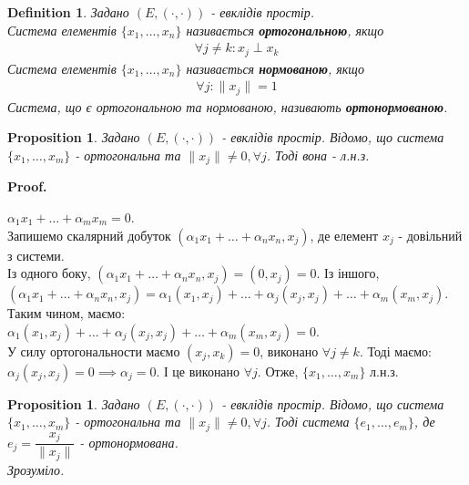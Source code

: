 \documentclass[a4paper, 10pt]{article}
\makeatletter
\theoremstyle{theoremdd}
\newtheorem{definition}[theorem]{Definition}
\newtheorem{proposition}[theorem]{Proposition}
\newtheorem{remark}[theorem]{Remark}
\renewenvironment{proof}[1][Proof.\\]{\par
\pushQED{\hfill \qed}%
\normalfont \topsep6\p@\@plus6\p@\relax
\trivlist
\item\relax
{\bfseries
#1\@addpunct{.}}\hspace\labelsep\ignorespaces
}{%
\popQED\endtrivlist\@endpefalse
}
\makeatother
\begin{document}
\begin{definition}
Задано $(E,(\cdot, \cdot))$ - евклідів простір.\\
Система елементів $\{x_1,\dots,x_n\}$ називається \textbf{ортогональною}, якщо
\begin{align*}
\forall j \neq k: x_j \perp x_k
\end{align*}
Система елементів $\{x_1,\dots,x_n\}$ називається \textbf{нормованою}, якщо
\begin{align*}
\forall j: \|x_j\| = 1
\end{align*}
Система, що є ортогональною та нормованою, називають \textbf{ортонормованою}.
\end{definition}

\iffalse
\begin{remark}
Надалі будемо скорочувати позначення $(x_j,x_k) = \delta_{jk} = \begin{cases} 0 & j \neq k \\ 1 & j = k \end{cases}$ - символ Кронекера.
\end{remark}
\fi

\begin{proposition}
Задано $(E,(\cdot,\cdot))$ - евклідів простір. Відомо, що система $\{x_1,\dots,x_m\}$ - ортогональна та $\|x_j\| \neq 0, \forall j$. Тоді вона - л.н.з.
\end{proposition}

\begin{proof}
$\alpha_1 x_1 + \dots + \alpha_m x_m = 0$.\\
Запишемо скалярний добуток $(\alpha_1 x_1 + \dots + \alpha_n x_n, x_j)$, де елемент $x_j$ - довільний з системи.\\
Із одного боку, $(\alpha_1 x_1 + \dots + \alpha_n x_n, x_j) = (0,x_j) = 0$. Із іншого,\\
$(\alpha_1 x_1 + \dots + \alpha_n x_n, x_j) = \alpha_1 (x_1,x_j) + \dots + \alpha_j (x_j,x_j) + \dots + \alpha_m (x_m,x_j)$.\\
Таким чином, маємо:\\
$\alpha_1 (x_1,x_j) + \dots + \alpha_j (x_j,x_j) + \dots + \alpha_m (x_m,x_j) = 0$.\\
У силу ортогональности маємо $(x_j,x_k) = 0$, виконано $\forall j \neq k$. Тоді маємо:\\
$\alpha_j (x_j,x_j) = 0 \implies \alpha_j = 0$.
І це виконано $\forall j$. Отже, $\{x_1,\dots,x_m\}$ л.н.з.
\end{proof}

\begin{proposition}
\label{orthogonal_to_orthonormal}
Задано $(E,(\cdot,\cdot))$ - евклідів простір. Відомо, що система $\{x_1,\dots,x_m\}$ - ортогональна та $\|x_j\| \neq 0, \forall j$. Тоді система $\{e_1,\dots,e_m\}$, де $e_j = \dfrac{x_j}{\|x_j\|}$ - ортонормована.\\
\textit{Зрозуміло.}
\end{proposition}
\end{document}
